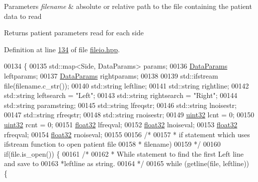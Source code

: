 \begin{DoxyParams}{Parameters}
{\em filename} & absolute or relative path to the file containing the patient data to read\\
\hline
\end{DoxyParams}
\begin{DoxyReturn}{Returns}
patient parameters read for each side 
\end{DoxyReturn}


Definition at line \hyperlink{fileio_8hpp_source_l00134}{134} of file \hyperlink{fileio_8hpp_source}{fileio.\+hpp}.


\begin{DoxyCode}
00134                                                        \{
00135         std::map<Side, DataParams> params;
00136         \hyperlink{structDataParams}{DataParams} leftparams;
00137         \hyperlink{structDataParams}{DataParams} rightparams;
00138 
00139         std::ifstream file(filename.c\_str());
00140         std::string leftline;
00141         std::string rightline;
00142         std::string leftsearch = \textcolor{stringliteral}{"Left"};
00143         std::string rightsearch = \textcolor{stringliteral}{"Right"};
00144         std::string paramstring;
00145         std::string lfreqstr;
00146         std::string lnoisestr;
00147         std::string rfreqstr;
00148         std::string rnoisestr;
00149         \hyperlink{definitions_8hpp_a1134b580f8da4de94ca6b1de4d37975e}{uint32} lcnt = 0;
00150         \hyperlink{definitions_8hpp_a1134b580f8da4de94ca6b1de4d37975e}{uint32} rcnt = 0;
00151         \hyperlink{definitions_8hpp_aacdc525d6f7bddb3ae95d5c311bd06a1}{float32} lfreqval;
00152         \hyperlink{definitions_8hpp_aacdc525d6f7bddb3ae95d5c311bd06a1}{float32} lnoiseval;
00153         \hyperlink{definitions_8hpp_aacdc525d6f7bddb3ae95d5c311bd06a1}{float32} rfreqval;
00154         \hyperlink{definitions_8hpp_aacdc525d6f7bddb3ae95d5c311bd06a1}{float32} rnoiseval;
00155 
00156         \textcolor{comment}{/*}
00157 \textcolor{comment}{         * if statement which uses ifstream function to open patient file }
00158 \textcolor{comment}{         * filename)}
00159 \textcolor{comment}{         */}
00160         \textcolor{keywordflow}{if}(file.is\_open()) \{
00161             \textcolor{comment}{/*}
00162 \textcolor{comment}{             * While statement to find the first Left line and save to }
00163 \textcolor{comment}{             *leftline as string.}
00164 \textcolor{comment}{             */}
00165             \textcolor{keywordflow}{while} (getline(file, leftline)) \{

\end{DoxyCode}
